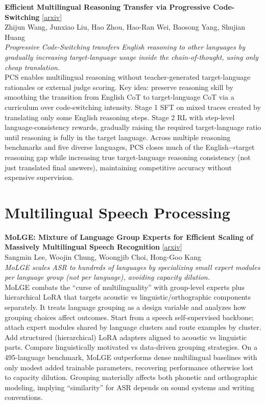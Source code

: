 \documentclass[12pt,letterpaper]{article}
\begin{document}
\medskip

{\small\textbf{Efficient Multilingual Reasoning Transfer via Progressive Code-Switching}} {\scriptsize[\href{https://arxiv.org/abs/2607.00485}{arxiv}]}\\
{\scriptsize Zhijun Wang, Junxiao Liu, Hao Zhou, Hao-Ran Wei, Baosong Yang, Shujian Huang}\\

{\small\textit{Progressive Code-Switching transfers English reasoning to other languages by gradually increasing target-language usage inside the chain-of-thought, using only cheap translation.}}\\[1pt]
{\footnotesize PCS enables multilingual reasoning without teacher-generated target-language rationales or external judge scoring. Key idea: preserve reasoning skill by smoothing the transition from English CoT to target-language CoT via a curriculum over code-switching intensity. Stage 1 SFT on mixed traces created by translating only some English reasoning steps. Stage 2 RL with step-level language-consistency rewards, gradually raising the required target-language ratio until reasoning is fully in the target language. Across multiple reasoning benchmarks and five diverse languages, PCS closes much of the English→target reasoning gap while increasing true target-language reasoning consistency (not just translated final answers), maintaining competitive accuracy without expensive supervision.}

\medskip


\section*{Multilingual Speech Processing}

{\small\textbf{MoLGE: Mixture of Language Group Experts for Efficient Scaling of Massively Multilingual Speech Recognition}} {\scriptsize[\href{https://arxiv.org/abs/2607.24030}{arxiv}]}\\
{\scriptsize Sangmin Lee, Woojin Chung, Woongjib Choi, Hong-Goo Kang}\\

{\small\textit{MoLGE scales ASR to hundreds of languages by specializing small expert modules per language group (not per language), avoiding capacity dilution.}}\\[1pt]
{\footnotesize MoLGE combats the ``curse of multilinguality'' with group-level experts plus hierarchical LoRA that targets acoustic vs linguistic/orthographic components separately. It treats language grouping as a design variable and analyzes how grouping choices affect outcomes. Start from a speech self-supervised backbone; attach expert modules shared by language clusters and route examples by cluster. Add structured (hierarchical) LoRA adapters aligned to acoustic vs linguistic parts. Compare linguistically motivated vs data-driven grouping strategies. On a 495-language benchmark, MoLGE outperforms dense multilingual baselines with only modest added trainable parameters, recovering performance otherwise lost to capacity dilution. Grouping materially affects both phonetic and orthographic modeling, implying ``similarity'' for ASR depends on sound systems and writing conventions.}
\end{document}
